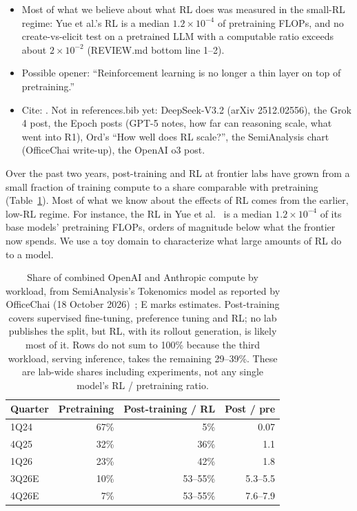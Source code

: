 {\begin{itemize}[nosep,leftmargin=1.2em]
  \item Most of what we believe about what RL does was measured in the small-RL regime: Yue et al.'s RL is a median
    $1.2\times10^{-4}$ of pretraining FLOPs, and no create-vs-elicit test on a pretrained LLM with a computable ratio
    exceeds about $2\times10^{-2}$ (REVIEW.md bottom line 1--2).
  \item Possible opener: ``Reinforcement learning is no longer a thin layer on top of pretraining.''
  \item Cite: \cite{yueDoesReinforcementLearning2025,guoDeepSeekR1IncentivizesReasoning2025}. Not in references.bib
    yet: DeepSeek-V3.2 (arXiv 2512.02556), the Grok 4 post, the Epoch posts (GPT-5 notes, how far can reasoning
    scale, what went into R1), Ord's ``How well does RL scale?'', the SemiAnalysis chart (OfficeChai write-up), the
    OpenAI o3 post.
\end{itemize}}
Over the past two years, post-training and RL at frontier labs have grown from a small fraction of training compute to
a share comparable with pretraining (Table~\ref{tab:compute-share}). Most of what we know about the effects of RL comes
from the earlier, low-RL regime. For instance, the RL in Yue et al.~\cite{yueDoesReinforcementLearning2025} is a median
$1.2\times10^{-4}$ of its base models' pretraining FLOPs, orders of magnitude below what the frontier now spends. We use
a toy domain to characterize what large amounts of RL do to a model.

\begin{table}[ht]
  \centering
  \small
  \caption{Share of combined OpenAI and Anthropic compute by workload, from SemiAnalysis's Tokenomics model as
    reported by OfficeChai (18 October 2026)~\cite{officechaiWhileShareInference2026}; E marks estimates. Post-training covers supervised fine-tuning,
    preference tuning and RL; no lab publishes the split, but RL, with its rollout generation, is likely most of it.
    Rows do not sum to 100\% because the third workload, serving inference, takes the remaining 29--39\%. These are
    lab-wide shares including experiments, not any single model's RL / pretraining ratio.}
  \label{tab:compute-share}
  \begin{tabular}{lrrr}
    \toprule
    Quarter & Pretraining & Post-training / RL & Post / pre \\
    \midrule
    1Q24  & 67\% & 5\%       & 0.07 \\
    4Q25  & 32\% & 36\%      & 1.1 \\
    1Q26  & 23\% & 42\%      & 1.8 \\
    3Q26E & 10\% & 53--55\%  & 5.3--5.5 \\
    4Q26E & 7\%  & 53--55\%  & 7.6--7.9 \\
    \bottomrule
  \end{tabular}
\end{table}

